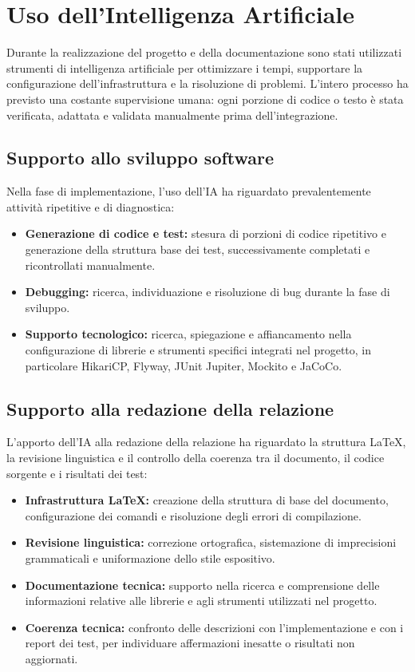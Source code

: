 \chapter{Uso dell'Intelligenza Artificiale}
\label{cap:processo-ia}
\label{cap:processo}

Durante la realizzazione del progetto e della documentazione sono stati utilizzati strumenti di intelligenza artificiale per ottimizzare i tempi, supportare la configurazione dell'infrastruttura e la risoluzione di problemi. L'intero processo ha previsto una costante supervisione umana: ogni porzione di codice o testo è stata verificata, adattata e validata manualmente prima dell'integrazione.

\section{Supporto allo sviluppo software}

Nella fase di implementazione, l'uso dell'IA ha riguardato prevalentemente attività ripetitive e di diagnostica:
\begin{itemize}
    \item \textbf{Generazione di codice e test:} stesura di porzioni di codice ripetitivo e generazione della struttura base dei test, successivamente completati e ricontrollati manualmente.
    \item \textbf{Debugging:} ricerca, individuazione e risoluzione di bug durante la fase di sviluppo.
    \item \textbf{Supporto tecnologico:} ricerca, spiegazione e affiancamento nella configurazione di librerie e strumenti specifici integrati nel progetto, in particolare HikariCP, Flyway, JUnit Jupiter, Mockito e JaCoCo.
\end{itemize}

\section{Supporto alla redazione della relazione}

L'apporto dell'IA alla redazione della relazione ha riguardato la struttura LaTeX, la revisione linguistica e il controllo della coerenza tra il documento, il codice sorgente e i risultati dei test:\begin{itemize}
    \item \textbf{Infrastruttura LaTeX:} creazione della struttura di base del documento, configurazione dei comandi e risoluzione degli errori di compilazione.
    \item \textbf{Revisione linguistica:} correzione ortografica, sistemazione di imprecisioni grammaticali e uniformazione dello stile espositivo.
    \item \textbf{Documentazione tecnica:} supporto nella ricerca e comprensione delle informazioni relative alle librerie e agli strumenti utilizzati nel progetto.
    \item \textbf{Coerenza tecnica:} confronto delle descrizioni con l'implementazione e con i report dei test, per individuare affermazioni inesatte o risultati non aggiornati.
\end{itemize}

